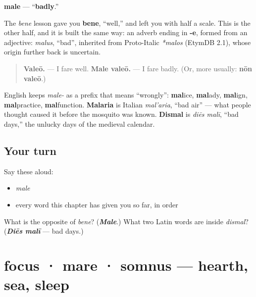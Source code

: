 \begin{cousinweb}
\textbf{male} — \textquotedblleft{}\textbf{badly}.\textquotedblright{}

The \emph{bene} lesson gave you \textbf{bene}, \textquotedblleft{}well,\textquotedblright{} and left you with half a scale. This is the other half, and it is built the same way: an adverb ending in \textbf{-e}, formed from an adjective: \emph{malus}, \textquotedblleft{}bad\textquotedblright{}, inherited from Proto-Italic \emph{*malos} (EtymDB 2.1), whose origin further back is uncertain.

\begin{quote}
\textbf{Valeō.} — I fare well. \textbf{Male valeō.} — I fare badly. (Or, more usually: \textbf{nōn valeō}.)
\end{quote}

English keeps \emph{male-} as a prefix that means \textquotedblleft{}wrongly\textquotedblright{}: \textbf{mal}ice, \textbf{mal}ady, \textbf{mal}ign, \textbf{mal}practice, \textbf{mal}function. \textbf{Malaria} is Italian \emph{mal'aria}, \textquotedblleft{}bad air\textquotedblright{} — what people thought caused it before the mosquito was known. \textbf{Dismal} is \emph{diēs malī}, \textquotedblleft{}bad days,\textquotedblright{} the unlucky days of the medieval calendar.
\end{cousinweb}

\subsection*{Your turn}
Say these aloud:

\begin{itemize}
\raggedright
  \item \emph{male}
  \item every word this chapter has given you so far, in order
\end{itemize}

\begin{tcolorbox}[breakable,colback=teal!4,colframe=teal!35!black,title={Before you move on}]
What is the opposite of \emph{bene}? (\emph{\textbf{Male}}.) What two Latin words are inside \emph{dismal}? (\emph{\textbf{Diēs malī}} — bad days.)
\end{tcolorbox}
\section[focus · mare · somnus]{focus · mare · somnus — hearth, sea, sleep}

